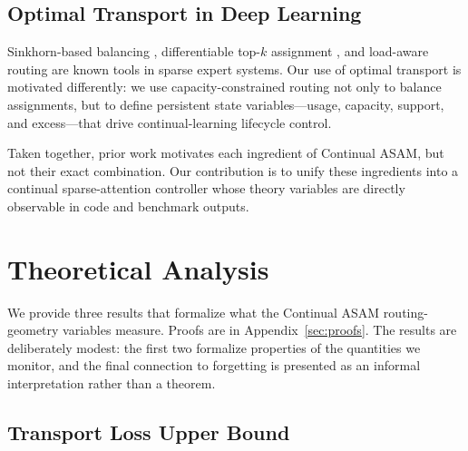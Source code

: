 \documentclass[11pt,a4paper]{article}
\theoremstyle{definition}
\begin{document}
\subsection{Optimal Transport in Deep Learning}

Sinkhorn-based balancing \citep{cuturi2013sinkhorn}, differentiable top-$k$ assignment \citep{xie2020differentiable}, and load-aware routing \citep{fedus2022switch} are known tools in sparse expert systems. Our use of optimal transport is motivated differently: we use capacity-constrained routing not only to balance assignments, but to define persistent state variables---usage, capacity, support, and excess---that drive continual-learning lifecycle control.

Taken together, prior work motivates each ingredient of Continual ASAM, but not their exact combination. Our contribution is to unify these ingredients into a continual sparse-attention controller whose theory variables are directly observable in code and benchmark outputs.

\section{Theoretical Analysis}
\label{sec:theory}

We provide three results that formalize what the Continual ASAM routing-geometry variables measure. Proofs are in Appendix~\ref{sec:proofs}. The results are deliberately modest: the first two formalize properties of the quantities we monitor, and the final connection to forgetting is presented as an informal interpretation rather than a theorem.

\subsection{Transport Loss Upper Bound}
\end{document}
